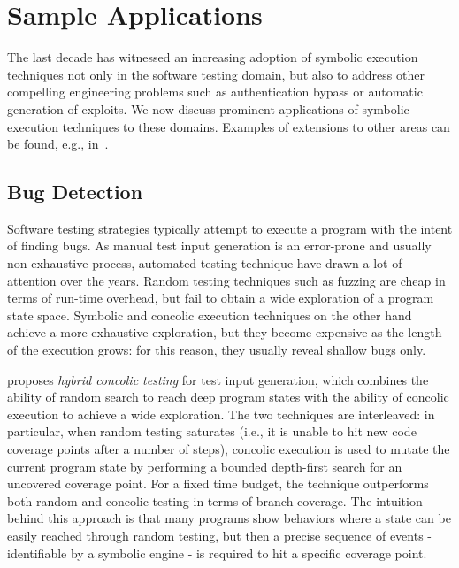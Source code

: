 
\section{Sample Applications}
\label{se:applications}

The last decade has witnessed an increasing adoption of symbolic execution techniques not only in the software testing domain, but also to address other compelling engineering problems such as authentication bypass or automatic generation of exploits. We now discuss prominent applications of symbolic execution techniques to these domains. Examples of extensions to other areas can be found, e.g., in~\cite{CGK-ICSE11}.

\subsection{Bug Detection}
\label{ss:bug-detection}

Software testing strategies typically attempt to execute a program with the intent of finding bugs. As manual test input generation is an error-prone and usually non-exhaustive process, automated testing technique have drawn a lot of attention over the years. Random testing techniques such as fuzzing are cheap in terms of run-time overhead, but fail to obtain a wide exploration of a program state space. Symbolic and concolic execution techniques on the other hand achieve a more exhaustive exploration, but they become expensive as the length of the execution grows: for this reason, they usually reveal shallow bugs only.

\cite{RK-ICSE07} proposes {\em hybrid concolic testing} for test input generation, which combines the ability of random search to reach deep program states with the ability of concolic execution to achieve a wide exploration. The two techniques are interleaved: in particular, when random testing saturates (i.e., it is unable to hit new code coverage points after a number of steps), concolic execution is used to mutate the current program state by performing a bounded depth-first search for an uncovered coverage point. For a fixed time budget, the technique outperforms both random and concolic testing in terms of branch coverage. The intuition behind this approach is that many programs show behaviors where a state can be easily reached through random testing, but then a precise sequence of events - identifiable by a symbolic engine - is required to hit a specific coverage point.


